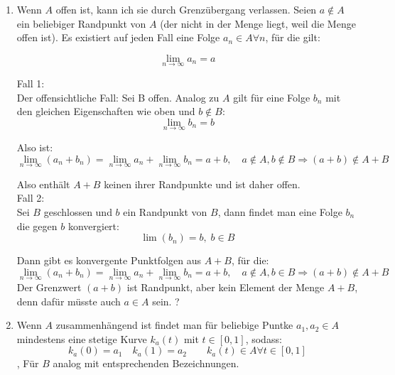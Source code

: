 \documentclass[a4paper,german,12pt,smallheadings]{scrartcl}
\begin{document}
\begin{enumerate}[(1)]
  \item
    Wenn $A$ offen ist, kann ich sie durch Grenzübergang verlassen. Seien $a
\notin A$ ein beliebiger Randpunkt von $A$ (der nicht in der Menge liegt,
    weil die Menge offen ist). Es existiert auf jeden Fall eine Folge $a_n \in
A \forall n$, für die gilt:

    \begin{equation*}
      \lim_{n \to \infty} a_n = a
    \end{equation*}

	Fall 1: \\
	Der offensichtliche Fall: Sei B offen. Analog zu $A$ gilt für eine Folge $b_n$ mit den gleichen Eigenschaften wie oben
    und $b \notin B$:
    \begin{equation*}
      \lim_{n \to \infty} b_n = b
    \end{equation*}

    Also ist:
    \begin{equation*}
      \lim_{n \to \infty} (a_n + b_n) = \lim_{n \to \infty} a_n + \lim_{n \to \infty} b_n = a + b, \quad a\notin A,b\notin B \Rightarrow (a+b)\notin A + B
    \end{equation*}

    Also enthält $A+B$ keinen ihrer Randpunkte und ist daher offen.\\
    
    Fall 2:\\
    Sei $B$ geschlossen und $b$ ein Randpunkt von $B$, dann findet man eine Folge $b_n$ die gegen $b$ konvergiert:
    \begin{equation*}
    \lim(b_n)=b, \; b\in B
    \end{equation*}
    
    Dann gibt es konvergente Punktfolgen aus $A+B$, für die:
    \begin{equation*}
    \lim_{n \to \infty} (a_n + b_n) = \lim_{n \to \infty} a_n + \lim_{n \to \infty} b_n = a + b, \quad a\notin A,b\in B \Rightarrow (a+b)\notin A + B
    \end{equation*}
	Der Grenzwert $(a+b)$ ist Randpunkt, aber kein Element der Menge $A+B$, denn dafür müsste auch $a\in A$ sein. ?

  \item
    Wenn $A$ zusammenhängend ist findet man für beliebige Puntke $a_1, a_2 \in A$
    mindestens eine stetige Kurve $k_a(t)$ mit $ t \in [0,1]$, sodass:
    \begin{equation*}
     k_a(0) = a_1 \quad k_a(1) = a_2 \quad \quad k_a(t) \in A \forall t\in[0,1]
     \end{equation*},
	Für $B$ analog mit entsprechenden Bezeichnungen.\\


\end{enumerate}
\end{document}
